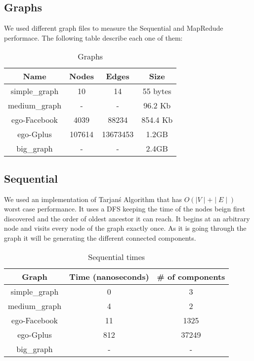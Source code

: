 \subsection{Graphs}

We used different graph files to measure the Sequential and MapRedude performace. The following table describe each one of them:

\begin{table}[h!]
\footnotesize
\begin{center}
\begin{tabular}{|c|c|c|c|}
\hline
{\bf Name} & {\bf Nodes}& {\bf Edges} & {\bf Size}\\
\hline
\hline
simple\_graph   & 10  & 14  & 55 bytes  \\
\hline
medium\_graph   & -  & -  & 96.2 Kb  \\
\hline
ego-Facebook   & 4039  & 88234  & 854.4 Kb  \\
\hline
ego-Gplus   & 107614  & 13673453  & 1.2GB  \\
\hline
big\_graph   & -  & -  & 2.4GB  \\
\hline
\end{tabular}
\caption{Graphs}
\label{tb:graphfiles}
\end{center}
\end{table}

\subsection{Sequential}
We used an implementation of Tarjan\'s Algorithm that has $O(\mid V \mid + \mid E \mid)$ worst case performance. It uses a DFS keeping the time of the nodes beign first discovered and the order of oldest ancestor it can reach. It begins at an arbitrary node and  visits every node of the graph exactly once. As it is going through the graph it will be generating the different connected components.

\begin{table}[h!]
\footnotesize
\begin{center}
\begin{tabular}{|c|c|c|}
\hline
{\bf Graph} & {\bf Time (nanoseconds)}& {\bf \# of components} \\
\hline
\hline
simple\_graph   & 0  & 3  \\
\hline
medium\_graph   & 4  & 2   \\
\hline
ego-Facebook   & 11  & 1325  \\
\hline
ego-Gplus   & 812 & 37249 \\
\hline
big\_graph   & -  & -  \\
\hline
\end{tabular}
\caption{Sequential times}
\label{tb:sequentialtimes}
\end{center}
\end{table}

